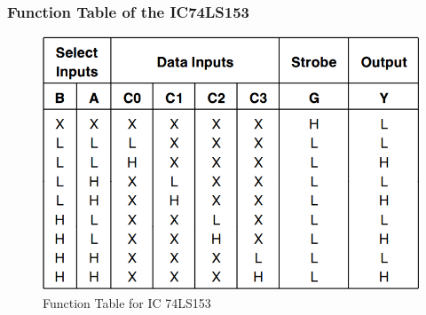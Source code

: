 \documentclass[11pt]{article}
\begin{document}
\subsubsection{Function Table of the IC74LS153}
\begin{figure}[H]
	\centering
	\includegraphics[scale = 0.5]{function_table.png}
	\caption{Function Table for IC 74LS153}
\end{figure}
\end{document}
